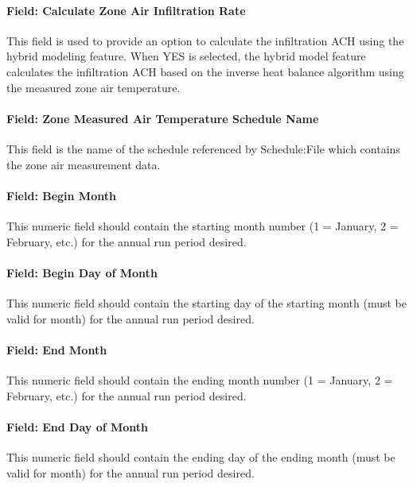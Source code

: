 \paragraph{Field: Calculate Zone Air Infiltration Rate}\label{field-calculate-zone-air-fnfiltration-rate-hm}

This field is used to provide an option to calculate the infiltration ACH using the hybrid modeling feature. When YES is selected, the hybrid model feature calculates the infiltration ACH based on the inverse heat balance algorithm using the measured zone air temperature.

\paragraph{Field: Zone Measured Air Temperature Schedule Name}\label{field-zone-measured-air-temperature-schedule-name-hm}

This field is the name of the schedule referenced by Schedule:File which contains the zone air measurement data. 

\paragraph{Field: Begin Month}\label{field-begin-month-hm}

This numeric field should contain the starting month number (1 = January, 2 = February, etc.) for the annual run period desired.

\paragraph{Field: Begin Day of Month}\label{field-begin-day-of-month-hm}

This numeric field should contain the starting day of the starting month (must be valid for month) for the annual run period desired.

\paragraph{Field: End Month}\label{field-end-month-hm}

This numeric field should contain the ending month number (1 = January, 2 = February, etc.) for the annual run period desired.

\paragraph{Field: End Day of Month}\label{field-end-day-of-month-hm}

This numeric field should contain the ending day of the ending month (must be valid for month) for the annual run period desired.

